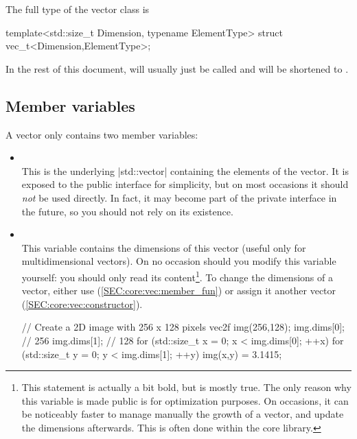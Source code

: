 \documentclass[12pt]{report}
\newcommand{\stdvec}{\cppinline|std::vector|\xspace}
\newenvironment{example}
{
    \begin{mdframed}[style=example,frametitle={Example}]
}
{
    \end{mdframed}
}
\begin{document}
The full type of the vector class is
\begin{cppcode}
template<std::size_t Dimension, typename ElementType>
struct vec_t<Dimension,ElementType>;
\end{cppcode}

In the rest of this document,  will usually just be called  and  will be shortened to .

\subsection{Member variables \label{SEC:core:vec:member_var}}

A vector only contains two member variables:
\begin{itemize}
\item {} \\ This is the underlying \stdvec containing the elements of the vector. It is exposed to the public interface for simplicity, but on most occasions it should \emph{not} be used directly. In fact, it may become part of the private interface in the future, so you should not rely on its existence.
\item {} \\ This variable contains the dimensions of this vector (useful only for multidimensional vectors). On no occasion should you modify this variable yourself: you should only read its content\footnote{This statement is actually a bit bold, but is mostly true. The only reason why this variable is made public is for optimization purposes. On occasions, it can be noticeably faster to manage manually the growth of a vector, and update the dimensions afterwards. This is often done within the core library.}. To change the dimensions of a vector, either use  (\ref{SEC:core:vec:member_fun}) or assign it another vector (\ref{SEC:core:vec:constructor}).

\begin{example}
\begin{cppcode}
// Create a 2D image with 256 x 128 pixels
vec2f img(256,128);
img.dims[0]; // 256
img.dims[1]; // 128
for (std::size_t x = 0; x < img.dims[0]; ++x)
for (std::size_t y = 0; y < img.dims[1]; ++y) {
    img(x,y) = 3.1415;
}
\end{cppcode}
\end{example}
\end{itemize}
\end{document}
